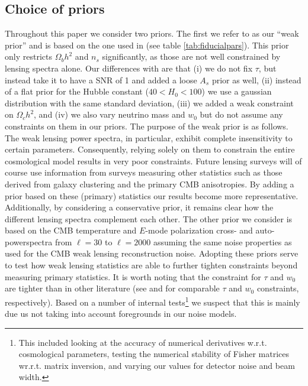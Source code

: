 \documentclass[11pt]{article} %
\begin{document}
\subsection{Choice of priors}
Throughout this paper we consider two priors. The first we refer to as our ``weak prior'' and is based on the one used in \cite{Planck2018Lensing} (see table \ref{tab:fiducialpars}). This prior only restricts $\Omega_b h^2$ and $n_s$ significantly, as those are not well constrained by lensing spectra alone. Our differences with \cite{Planck2018Lensing} are that (i) we do not fix $\tau$, but instead take it to have a SNR of 1 and added a loose $A_s$ prior as well, (ii) instead of a flat prior for the Hubble constant ($40 < H_0 < 100$) we use a gaussian distribution with the same standard deviation, (iii) we added a weak constraint on $\Omega_c h^2$, and (iv) we also vary neutrino mass and $w_0$ but do not assume any constraints on them in our priors. The purpose of the weak prior is as follows. The weak lensing power spectra, in particular, exhibit complete insensitivity to certain parameters. Consequently, relying solely on them to constrain the entire cosmological model results in very poor constraints. Future lensing surveys will of course use information from surveys measuring other statistics such as those derived from galaxy clustering and the primary CMB anisotropies. By adding a prior based on these (primary) statistics our results become more representative. Additionally, by considering a conservative prior, it remains clear how the different lensing spectra complement each other. The other prior we consider is based on the CMB temperature and $E$-mode polarization cross- and auto-powerspectra from $\ell=30$ to $\ell = 2000$ assuming the same noise properties as used for the CMB weak lensing reconstruction noise. Adopting these priors  serve to test how weak lensing statistics are able to further tighten constraints beyond measuring primary statistics. It is worth noting that the constraint for $\tau$ and $w_0$ are tighter than in other literature (see \cite{cmbs4sciencebook} and \cite{Namikawa_2016} for comparable $\tau$ and $w_0$ constraints, respectively). Based on a number of internal tests\footnote{
This included looking at the accuracy of numerical derivatives w.r.t. cosmological parameters, testing the numerical stability of Fisher matrices wr.r.t. matrix inversion, and varying our values for detector noise and beam width.
} we suspect that this is mainly due us not taking into account foregrounds in our noise models.
\end{document}
